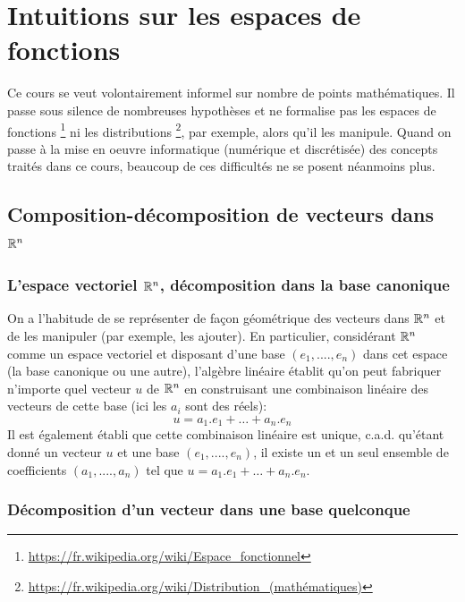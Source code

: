 

\chapter{Intuitions sur les espaces de fonctions}

Ce cours se veut volontairement informel sur nombre de points mathématiques. Il passe sous silence de nombreuses hypothèses et ne formalise pas les espaces de fonctions \footnote{\url{https://fr.wikipedia.org/wiki/Espace_fonctionnel}} ni les distributions \footnote{\url{https://fr.wikipedia.org/wiki/Distribution_(mathématiques)}}, par exemple, alors qu'il les manipule. Quand on passe à la mise en oeuvre informatique (numérique et discrétisée) des concepts traités dans ce cours, beaucoup de ces difficultés ne se posent néanmoins plus.

\section{Composition-décomposition de vecteurs dans \texorpdfstring{$\mathbb{R}^n$}{\pdfRR\superscriptn}}

\subsection{L'espace vectoriel \texorpdfstring{$\mathbb{R}^n$}{\pdfRR\superscriptn}, décomposition dans la base canonique}

On a l'habitude de se représenter de façon géométrique des vecteurs dans $\mathbb{R}^n$ et de les manipuler (par exemple, les ajouter). En particulier, considérant $\mathbb{R}^n$ comme un espace vectoriel et disposant d'une base $(e_1,....,e_n)$ dans cet espace (la base canonique ou une autre), l'algèbre linéaire établit qu'on peut fabriquer n'importe quel vecteur $u$ de $\mathbb{R}^n$ en construisant une combinaison linéaire des vecteurs de cette base (ici les $a_i$ sont des réels):
\begin{equation}
u=a_1.e_1+\dots+a_n.e_n
\label{eq:decomposition_lineaire}
\end{equation} 
Il est également établi que cette combinaison linéaire est unique, c.a.d. qu'étant donné un vecteur $u$ et une base $(e_1,....,e_n)$, il existe un et un seul ensemble de coefficients $(a_1,....,a_n)$ tel que $u=a_1.e_1+\dots+a_n.e_n$.

\subsection{Décomposition d'un vecteur dans une base quelconque}

